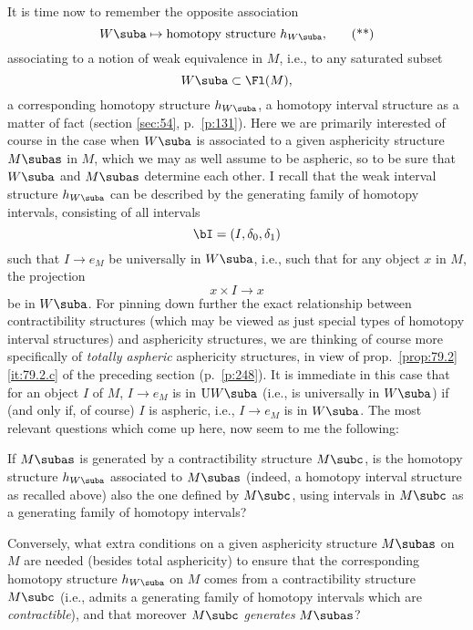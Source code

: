 It is time now to remember the opposite association
\begin{equation}
  \label{eq:80.starstar}
  W\suba\mapsto\text{homotopy structure $h_{W\suba}$,}\tag{**}
\end{equation}
associating to a notion of weak equivalence in $M$, i.e.,
to any saturated subset
\[W\suba \subset \Fl(M),\]
a corresponding homotopy structure $h_{W\suba}$, a homotopy interval
structure as a matter of fact (section \ref{sec:54}, p.\
\ref{p:131}). Here we are primarily interested of course in the case
when $W\suba$ is associated to a given asphericity structure $M\subas$
in $M$, which we may as well assume to be aspheric, so to be sure that
$W\suba$ and $M\subas$ determine each other. I recall that the weak
interval structure $h_{W\suba}$ can be described by the generating
family of homotopy intervals, consisting of all intervals
\[ \bI=(I,\delta_0,\delta_1) \]
such that $I\to e_M$ be universally in $W\suba$, i.e., such that for
any object $x$ in $M$, the projection
\[ x\times I\to x\]
be in $W\suba$. For pinning down further the exact relationship
between contractibility structures (which may be viewed as just
special types of homotopy interval structures) and asphericity
structures, we are thinking of course more specifically of
\emph{totally aspheric} asphericity structures, in view of prop.\
\ref{prop:79.2} \ref{it:79.2.c} of the preceding section (p.\
\ref{p:248}). It is immediate in this case that for an object $I$ of
$M$, $I\to e_M$ is in $\mathrm UW\suba$ (i.e., is universally in
$W\suba$) if (and only if, of course) $I$ is aspheric, i.e., $I\to
e_M$ is in $W\suba$. The most relevant questions which come up here,
now seem to me the following:

\namedlabel{q:80.1}{1)}\enspace If $M\subas$ is generated by a
contractibility structure $M\subc$, is the homotopy structure
$h_{W\suba}$ associated to $M\subas$ (indeed, a homotopy interval
structure as recalled above) also the one defined by $M\subc$, using
intervals in $M\subc$ as a generating family of homotopy intervals?

\namedlabel{q:80.2}{2)}\enspace Conversely, what extra conditions on a
given asphericity structure $M\subas$ on $M$ are needed (besides total
asphericity) to ensure that the corresponding homotopy structure
$h_{W\suba}$ on $M$ comes from a contractibility structure $M\subc$
(i.e., admits a generating family of homotopy intervals which are
\emph{contractible}),\pspage{257} and that moreover $M\subc$
\emph{generates} $M\subas$?


